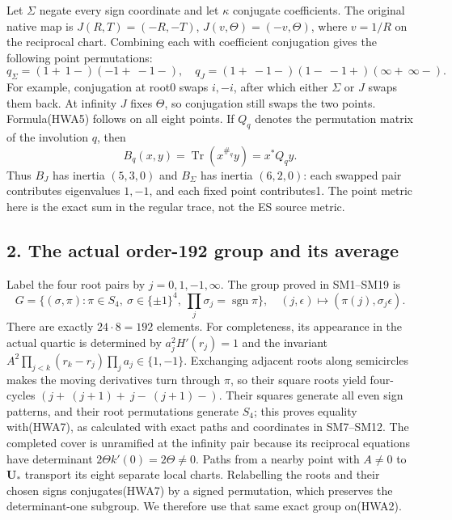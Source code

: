 \documentclass[
  10pt,
  a4paper,
]{article}
\begin{document}
Let \(\Sigma\) negate every sign coordinate and let \(\kappa\) conjugate
coefficients. The original native map is \(J(R,T)=(-R,-T)\),
\(J(v,\Theta)=(-v,\Theta)\), where \(v=1/R\) on the reciprocal chart.
Combining each with coefficient conjugation gives the following point
permutations: \[
q_\Sigma=(1+\ 1-)(-1+\ -1-),
\quad
q_J=(1+\ -1-)(1-\ -1+)(\infty+\ \infty-).
\tag{HWA5}
\] For example, conjugation at root0 swaps \(i,-i\), after which either
\(\Sigma\) or \(J\) swaps them back. At infinity \(J\) fixes \(\Theta\),
so conjugation still swaps the two points. Formula(HWA5) follows on all
eight points. If \(Q_q\) denotes the permutation matrix of the
involution \(q\), then \[
B_q(x,y)=\operatorname{Tr}(x^{\#_q}y)=x^*Q_qy.
\tag{HWA6}
\] Thus \(B_J\) has inertia \((5,3,0)\) and \(B_\Sigma\) has inertia
\((6,2,0)\): each swapped pair contributes eigenvalues \(1,-1\), and
each fixed point contributes1. The point metric here is the exact sum in
the regular trace, not the ES source metric.

\subsection{2. The actual order-192 group and its
average}\label{the-actual-order-192-group-and-its-average}

Label the four root pairs by \(j=0,1,-1,\infty\). The group proved in
SM1--SM19 is \[
G=\{(\sigma,\pi):\pi\in S_4,\ \sigma\in\{\pm1\}^4,
\ \prod_j\sigma_j=\operatorname{sgn}\pi\},
\quad(j,\epsilon)\mapsto(\pi(j),\sigma_j\epsilon).
\tag{HWA7}
\] There are exactly \(24\cdot8=192\) elements. For completeness, its
appearance in the actual quartic is determined by \(a_j^2H'(r_j)=1\) and
the invariant \(A^2\prod_{j<k}(r_k-r_j)\prod_ja_j\in\{1,-1\}\).
Exchanging adjacent roots along semicircles makes the moving derivatives
turn through \(\pi\), so their square roots yield four-cycles
\((j+\ (j+1)+\ j-\ (j+1)-)\). Their squares generate all even sign
patterns, and their root permutations generate \(S_4\); this proves
equality with(HWA7), as calculated with exact paths and coordinates in
SM7--SM12. The completed cover is unramified at the infinity pair
because its reciprocal equations have determinant
\(2\Theta k'(0)=2\Theta\ne0\). Paths from a nearby point with \(A\ne0\)
to \(\mathbf U_*\) transport its eight separate local charts.
Relabelling the roots and their chosen signs conjugates(HWA7) by a
signed permutation, which preserves the determinant-one subgroup. We
therefore use that same exact group on(HWA2).
\end{document}
